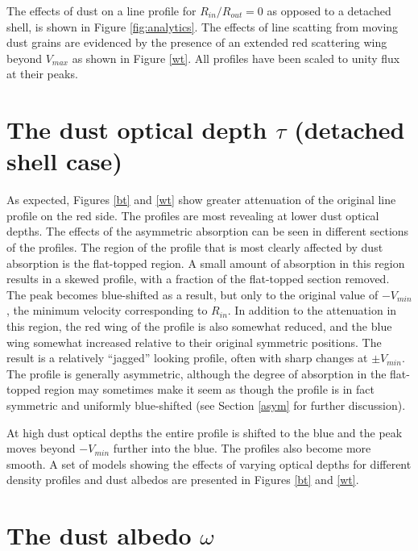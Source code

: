 The effects of dust on a line profile for $R_{in}/R_{out}=0$ as opposed 
to a detached shell, is shown in Figure \ref{fig:analytics}.  
The effects of line scatting from moving dust grains are evidenced 
by the presence of an extended red scattering wing beyond $V_{max}$ as shown in Figure \ref{wt}. 
All profiles have been scaled to unity flux at their peaks.



\section{The dust optical depth $\tau$ (detached shell case)}
\label{tau}

As expected, Figures \ref{bt} and \ref{wt} show greater attenuation of the original line profile on 
the red side.  The profiles are most revealing at lower 
dust optical depths.  The effects of the asymmetric absorption can be seen in 
different sections of the profiles.  The region of the profile that is 
most clearly affected by dust absorption is the flat-topped region.  A 
small amount of absorption in this region results in a skewed profile, 
with a fraction of the flat-topped section removed.  The peak becomes 
blue-shifted as a result, but only to the original value of $-V_{min}$, the minimum 
velocity corresponding to $R_{in}$. In addition to the attenuation in this region, 
the red wing of the profile is also somewhat reduced, and the blue wing 
somewhat increased relative to their original symmetric positions.  The 
result is a relatively ``jagged'' looking profile, often with sharp changes 
at $\pm V_{min}$.  The profile is generally asymmetric, although the 
degree of absorption in the flat-topped region may sometimes make it seem 
as though the profile is in fact symmetric and uniformly blue-shifted (see 
Section \ref{asym} for further discussion).

At high dust optical depths the entire profile is shifted to the blue and the 
peak moves beyond $-V_{min}$ further into the blue.  The 
profiles also become more smooth.  A set of models showing 
the effects of varying optical depths for different density profiles and 
dust albedos are presented in Figures \ref{bt} and \ref{wt}.


\section{The dust albedo $\omega$}
\label{omega}

